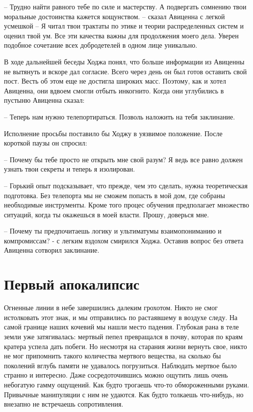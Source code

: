 \documentclass[12pt,a4paper]{article}
\begin{document}
-- Трудно найти равного тебе по силе и мастерству. А подвергать сомнению твои моральные достоинства кажется кощунством. -- сказал Авиценна с легкой усмешкой -- Я читал твои трактаты по этике и теории распределенных систем и оценил твой ум. Все эти качества важны для продолжения моего дела. Уверен подобное сочетание всех добродетелей в одном лице уникально.

В ходе дальнейшей беседы Ходжа понял, что больше информации из Авиценны не вытянуть и вскоре дал согласие. Всего через день он был готов оставить свой пост. Весть об этом еще не достигла широких масс. Поэтому, как и хотел Авиценна, они вдвоем смогли отбыть инкогнито. Когда они углубились в пустыню Авиценна сказал:

-- Теперь нам нужно телепортираться. Позволь наложить на тебя заклинание.

Исполнение просьбы поставило бы Ходжу в уязвимое положение. После короткой паузы он спросил:

-- Почему бы тебе просто не открыть мне свой разум? Я ведь все равно должен узнать твои секреты и теперь я изолирован.

-- Горький опыт подсказывает, что прежде, чем это сделать, нужна теоретическая подготовка. Без телепорта мы не сможем попасть в мой дом, где собраны необходимые инструменты. Кроме того процес обучения предполагает множество ситуаций, когда ты окажешься в моей власти. Прошу, доверься мне.

-- Почему ты предпочитаешь логику и ультиматумы взаимопониманию и компромиссам? - с легким вздохом смирился Ходжа.
Оставив вопрос без ответа Авиценна сотворил заклинание.



\section*{Первый апокалипсис}

Огненные линии в небе завершились далеким грохотом. Никто не смог истолковать этот знак, и мы отправились по растаявшему в воздухе следу. На самой границе наших кочевий мы нашли место падения. Глубокая рана в теле земли уже затягивалась: мертвый пепел превращался в почву, которая по краям кратера успела дать побеги. Но несмотря на старания жизни вернуть свое, никто не мог припомнить такого количества мертвого вещества, на сколько бы поколений вглубь памяти не удавалось погрузиться. Наблюдать мертвое было странно и интересно. Даже сосредоточившись можно ощутить лишь очень небогатую гамму ощущений. Как будто трогаешь что-то обмороженными руками. Привычные манипуляции с ним не удаются. Как будто толкаешь что-нибудь, но внезапно не встречаешь сопротивления.
\end{document}
